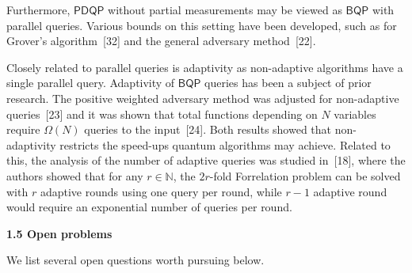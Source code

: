 Furthermore, $\mathsf{PDQP}$ without partial measurements may be viewed as $\mathsf{BQP}$ with parallel queries. Various bounds on this setting have been developed, such as for Grover’s algorithm [32] and the general adversary method [22].\par




Closely related to parallel queries is adaptivity as non-adaptive algorithms have a single parallel query. Adaptivity of $\mathsf{BQP}$ queries has been a subject of prior research. The positive weighted adversary method was adjusted for non-adaptive queries [23] and it was shown that total functions depending on $N$ variables require $\Omega(N)$ queries to the input [24]. Both results showed that non-adaptivity restricts the speed-ups quantum algorithms may achieve. Related to this, the analysis of the number of adaptive queries was studied in [18], where the authors showed that for any $r\in\mathbb{N}$, the $2r$-fold Forrelation problem can be solved with $r$ adaptive rounds using one query per round, while $r-1$ adaptive round would require an exponential number of queries per round.\par





\par\medskip\noindent\textbf{
1.5 Open problems}\par




We list several open questions worth pursuing below.\par


